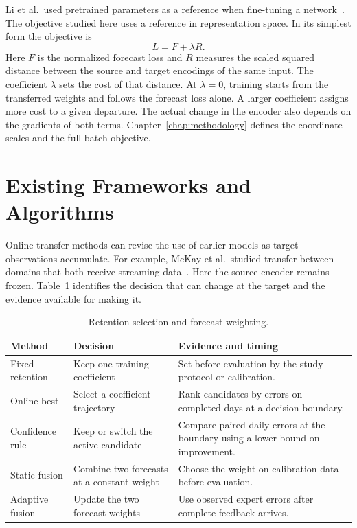 Li et al.\ used pretrained parameters as a reference when fine-tuning a network~\cite{li2018}. The objective studied here uses a reference in representation space. In its simplest form the objective is
\begin{equation}
L=F+\lambda R.
\end{equation}
Here $F$ is the normalized forecast loss and $R$ measures the scaled squared distance between the source and target encodings of the same input. The coefficient $\lambda$ sets the cost of that distance. At $\lambda=0$, training starts from the transferred weights and follows the forecast loss alone. A larger coefficient assigns more cost to a given departure. The actual change in the encoder also depends on the gradients of both terms. Chapter~\ref{chap:methodology} defines the coordinate scales and the full batch objective.

\section{Existing Frameworks and Algorithms}\label{sec:exist_frameworks_algorithms}

Online transfer methods can revise the use of earlier models as target observations accumulate. For example, McKay et al.\ studied transfer between domains that both receive streaming data~\cite{mckay2020botl}. Here the source encoder remains frozen. Table~\ref{tab:algorithms} identifies the decision that can change at the target and the evidence available for making it.

\begin{table}[htbp]\centering\small
\caption{Retention selection and forecast weighting.}\label{tab:algorithms}
\begin{tabularx}{\linewidth}{@{}l>{\raggedright\arraybackslash}X>{\raggedright\arraybackslash}X@{}}\toprule
Method & Decision & Evidence and timing\\\midrule
Fixed retention & Keep one training coefficient & Set before evaluation by the study protocol or calibration.\\
Online-best & Select a coefficient trajectory & Rank candidates by errors on completed days at a decision boundary.\\
Confidence rule & Keep or switch the active candidate & Compare paired daily errors at the boundary using a lower bound on improvement.\\
Static fusion & Combine two forecasts at a constant weight & Choose the weight on calibration data before evaluation.\\
Adaptive fusion & Update the two forecast weights & Use observed expert errors after complete feedback arrives.\\\bottomrule
\end{tabularx}\end{table}

